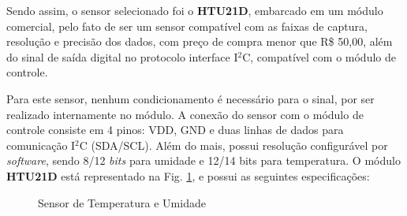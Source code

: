     Sendo assim, o sensor selecionado foi o \textbf{HTU21D}, embarcado em um módulo comercial, pelo fato de ser um sensor compatível com as faixas de captura, resolução e precisão dos dados, com preço de compra menor que R\$ 50,00,  além do sinal de saída digital no protocolo interface I$^2$C, compatível com o módulo de controle.
    
    Para este sensor, nenhum condicionamento é necessário para o sinal, por ser realizado internamente no módulo. A conexão do sensor com o módulo de controle consiste em 4 pinos: VDD, GND e duas linhas de dados para comunicação I$^2$C (SDA/SCL). Além do mais, possui resolução configurável por \textit{software}, sendo 8/12 \textit{bits} para umidade e 12/14 bits para temperatura. O módulo \textbf{HTU21D} está representado na Fig. \ref{fig:sensor_temp_umidade}, e possui as seguintes especificações:
    
    \begin{figure}[H]
        \centering
        \hspace{0.1\textwidth}
        \caption{Sensor de Temperatura e Umidade}\label{fig:sensor_temp_umidade}
    \end{figure}
    
